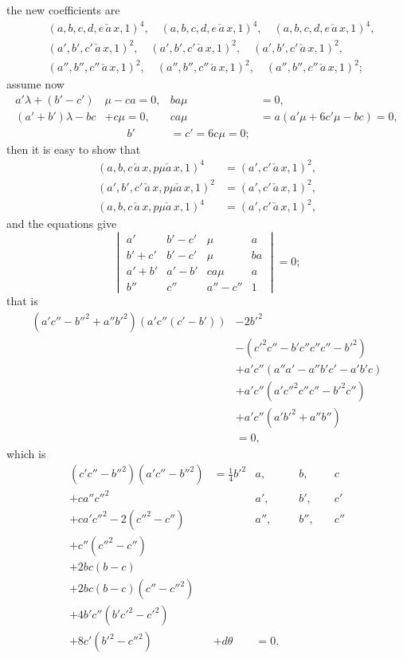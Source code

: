 ﻿\documentclass[11pt,a4paper]{article}
\theoremstyle{plain}
\theoremstyle{definition}
\begin{document}
the new coefficients are
\begin{align*}
&(a, b, c, d, e\,\check{a}\,x, 1)^4, \quad (a, b, c, d, e\,\check{a}\,x, 1)^4, \quad (a, b, c, d, e\,\check{a}\,x, 1)^4,\\
&(a', b', c'\,\check{a}\,x, 1)^2, \quad (a', b', c'\,\check{a}\,x, 1)^2, \quad (a', b', c'\,\check{a}\,x, 1)^2,\\
&(a'', b'', c''\,\check{a}\,x, 1)^2, \quad (a'', b'', c''\,\check{a}\,x, 1)^2, \quad (a'', b'', c''\,\check{a}\,x, 1)^2;
\end{align*}
assume now
\begin{align*}
a' \lambda + (b' - c')&\mu - ca = 0, & ba\mu &= 0,\\
(a' + b')\lambda - bc &+ c\mu = 0, & ca\mu &= a(a' \mu + 6c'\mu - bc) = 0,\\
&\quad\quad b' &= c' = 6c \mu = 0;
\end{align*}
then it is easy to show that
\begin{align*}
(a, b, c\,\check{a}\,x, p\mu\check{a}\,x, 1)^4 &= (a', c'\,\check{a}\,x, 1)^2,\\
(a', b', c'\,\check{a}\,x, p\mu\check{a}\,x, 1)^2 &= (a', c'\,\check{a}\,x, 1)^2,\\
(a, b, c\,\check{a}\,x, p\mu\check{a}\,x, 1)^4 &= (a', c'\,\check{a}\,x, 1)^2,
\end{align*}
and the equations give
\[
\begin{vmatrix}
a' & b' - c' & \mu & a \\
b' + c' & b' - c' & \mu & ba \\
a' + b' & a' - b' & ca\mu & a \\
b'' & c'' & a'' - c'' & 1
\end{vmatrix} = 0;
\]
that is
\begin{align*}
(a' c'' - b''^2 + a''b'^2)(a' c''(c'-b')) &- 2b'^2 \\
&- (c'^2 c'' - b' c'' c'' c'' - b'^2)\\
&+ a' c'' (a'' a' - a'' b' c' - a' b' c)\\
&+ a' c''(a' c''^2 c'' c'' - b'^2 c'')\\
&+ a' c''(a' b'^2 + a'' b'')\\
&= 0,
\end{align*}
which is
\begin{align*}
(c'c'' - b''^2)(a' c'' - b''^2) &= \tfrac{1}{4}b'^2 & a, & \quad b, & \quad c\\
+ ca'' c''^2 &  & a', & \quad b', & \quad c'\\
+ ca' c''^2 - 2(c''^2 - c'')   &  & a'', & \quad b'', & \quad c''\\
+ c''(c''^2 - c'') &\\
+ 2bc(b - c) &\\
+ 2bc(b - c)(c'' - c''^2)&\\
+ 4b' c''(b' c'^2 - c'^2) &\\
+ 8c'(b'^2 - c''^2) &  + d\theta &= 0.
\end{align*}
\end{document}
